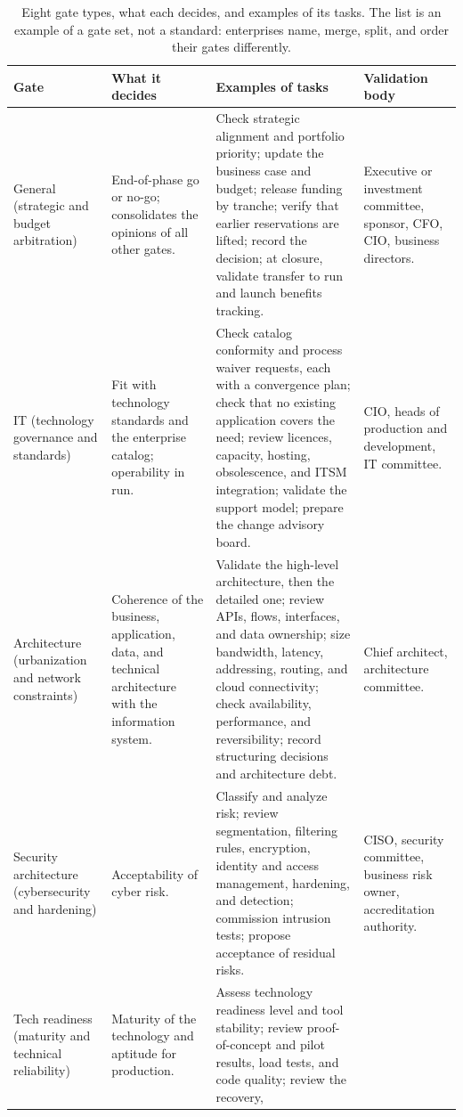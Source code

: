 \begin{table}[!htb]
\centering\footnotesize\renewcommand{\arraystretch}{1.15}
\caption{Eight gate types, what each decides, and examples of its tasks. The list is an example of a
gate set, not a standard: enterprises name, merge, split, and order their gates differently.}
\label{tab:gates}
\begin{tabularx}{\linewidth}{@{}P{2.3cm}P{3.5cm}LP{2.9cm}@{}}
\toprule
Gate & What it decides & Examples of tasks & Validation body\\
\midrule
General (strategic and budget arbitration) & End-of-phase go or no-go; consolidates the opinions of all
other gates. & Check strategic alignment and portfolio priority; update the business case and budget;
release funding by tranche; verify that earlier reservations are lifted; record the decision; at closure,
validate transfer to run and launch benefits tracking. & Executive or investment committee, sponsor, CFO,
CIO, business directors.\\
IT (technology governance and standards) & Fit with technology standards and the enterprise catalog;
operability in run. & Check catalog conformity and process waiver requests, each with a convergence plan; check
that no existing application covers the need; review licences, capacity, hosting, obsolescence, and ITSM integration; validate the support model; prepare the change advisory board. &
CIO, heads of production and development, IT committee.\\
Architecture (urbanization and network constraints) & Coherence of the business, application, data, and
technical architecture with the information system. & Validate the high-level architecture, then the detailed one; review APIs, flows, interfaces, and data ownership; size bandwidth, latency, addressing,
routing, and cloud connectivity; check availability, performance, and reversibility; record structuring
decisions and architecture debt. & Chief architect, architecture committee.\\
Security architecture (cybersecurity and hardening) & Acceptability of cyber risk. & Classify and analyze
risk; review segmentation, filtering rules, encryption, identity and access management, hardening, and
detection; commission intrusion tests; propose acceptance of residual risks. & CISO, security committee,
business risk owner, accreditation authority.\\
Tech readiness (maturity and technical reliability) & Maturity of the technology and aptitude for
production. & Assess technology readiness level and tool stability; review proof-of-concept and pilot results, load tests, and code quality; review the recovery,

\end{tabularx}
\end{table}
